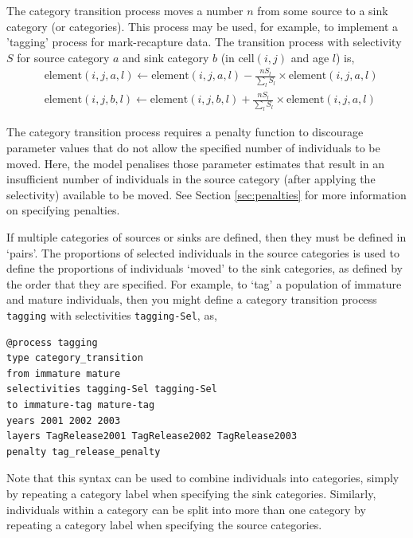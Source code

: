 The category transition process moves a number $n$ from some source to a sink category (or categories). This process may be used, for example, to implement a 'tagging' process for mark-recapture data. The transition process with selectivity $S$ for source category $a$ and sink category $b$ (in cell$(i,j)$ and age $l$) is,
\begin{equation}\begin{split}
  & \text{element}(i,j,a,l) \leftarrow \text{element}(i,j,a,l) - \frac{nS_l}{\sum\limits_l S_l} \times \text{element}(i,j,a,l) \\
  & \text{element}(i,j,b,l) \leftarrow \text{element}(i,j,b,l) + \frac{nS_l}{\sum\limits_l S_l} \times \text{element}(i,j,a,l)
\end{split}\end{equation}

The category transition process requires a penalty function to discourage parameter values that do not allow the specified number of individuals to be moved. Here, the model penalises those parameter estimates that result in an insufficient number of individuals in the source category (after applying the selectivity) available to be moved. See Section \ref{sec:penalties} for more information on specifying penalties.

If multiple categories of sources or sinks are defined, then they must be defined in `pairs'. The proportions of selected individuals in the source categories is used to define the proportions of individuals `moved' to the sink categories, as defined by the order that they are specified. For example, to `tag' a population of immature and mature individuals, then you might define a category transition process \texttt{tagging} with selectivities \texttt{tagging-Sel}, as,
{\small{\begin{verbatim}
@process tagging
type category_transition
from immature mature
selectivities tagging-Sel tagging-Sel
to immature-tag mature-tag
years 2001 2002 2003
layers TagRelease2001 TagRelease2002 TagRelease2003
penalty tag_release_penalty
\end{verbatim}}}

Note that this syntax can be used to combine individuals into categories, simply by repeating a category label when specifying the sink categories. Similarly, individuals within a category can be split into more than one category by repeating a category label when specifying the source categories.

\subsubsection*{}

